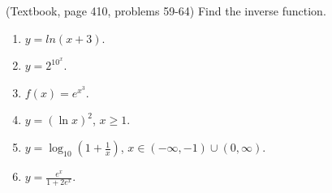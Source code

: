 \begin{problem} (Textbook, page 410, problems 59-64)
Find the inverse function. 
\begin{multicols}{2}
\begin{enumerate}
\item $y=ln (x+3)$.

\item $y=2^{10^x}$.

\item $f(x)=e^{x^3}$.

\item $y=(\ln x)^2$, $x\geq 1$.

\item $y=\log_{10}\left(1+\frac{1}{x} \right)$, $x\in (-\infty, -1)\cup (0, \infty)$.

\item $y=\frac{e^x}{1+2e^x}$.

\end{enumerate}
\end{multicols}
\end{problem}
